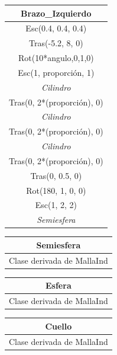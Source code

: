 \documentclass{article}
\begin{document}
\begin{table}[h!]
	\centering
	\label{7}
	\begin{tabular}{|c|}
		\hline
		\textbf{Brazo\_Izquierdo}\\ \hline
		Esc(0.4, 0.4, 0.4)\\ \hline
		Tras(-5.2, 8, 0)\\ \hline
		Rot(10*angulo,0,1,0)\\ \hline
		Esc(1, proporción, 1)\\ \hline
		\textit{Cilindro}\\ \hline
		Tras(0, 2*(proporción), 0)\\ \hline
		\textit{Cilindro}\\ \hline
		Tras(0, 2*(proporción), 0)\\ \hline
		\textit{Cilindro}\\ \hline
		Tras(0, 2*(proporción), 0)\\ \hline
		Tras(0, 0.5, 0)\\ \hline
		Rot(180, 1, 0, 0)\\ \hline
		Esc(1, 2, 2)\\ \hline
		\textit{Semiesfera}\\ \hline
	\end{tabular}
\end{table}

\begin{table}[h!]
	\centering
	\label{8}
	\begin{tabular}{|c|}
		\hline
		\textbf{Semiesfera}\\ \hline
		Clase derivada de MallaInd\\ \hline
	\end{tabular}
\end{table}

\begin{table}[h!]
	\centering
	\label{9}
	\begin{tabular}{|c|}
		\hline
		\textbf{Esfera}\\ \hline
		Clase derivada de MallaInd\\ \hline
	\end{tabular}
\end{table}

\begin{table}[h!]
	\centering
	\label{10}
	\begin{tabular}{|c|}
		\hline
		\textbf{Cuello}\\ \hline
		Clase derivada de MallaInd\\ \hline
	\end{tabular}
\end{table}
\end{document}
